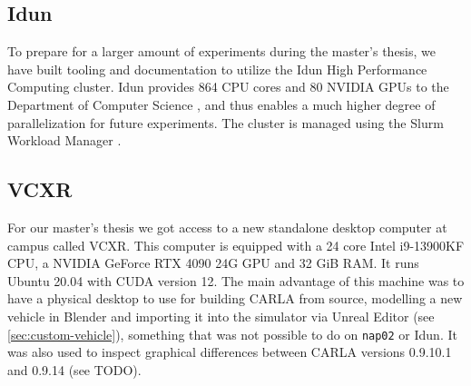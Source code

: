 \subsection{Idun}
To prepare for a larger amount of experiments during the master's thesis,
we have built tooling and documentation to utilize the Idun High Performance Computing cluster.
Idun provides 864 CPU cores and 80 NVIDIA GPUs to the Department of Computer Science \cite{idun:overview},
and thus enables a much higher degree of parallelization for future experiments.
The cluster is managed using the Slurm Workload Manager \cite{slurm}.


\subsection{VCXR}
For our master's thesis we got access to a new standalone desktop computer at campus called VCXR. This computer is equipped with 
a 24 core Intel i9-13900KF CPU, a NVIDIA GeForce RTX 4090 24G GPU and 32 GiB RAM. It runs Ubuntu 20.04 with CUDA version 12. The main advantage of this machine was to have a physical desktop to use for building CARLA from source, modelling a new vehicle in Blender and importing it into the simulator via Unreal Editor (see \cref{sec:custom-vehicle}), something that was not possible to do on \texttt{nap02} or Idun. It was also used to inspect graphical differences between CARLA versions 0.9.10.1 and 0.9.14 (see TODO).
